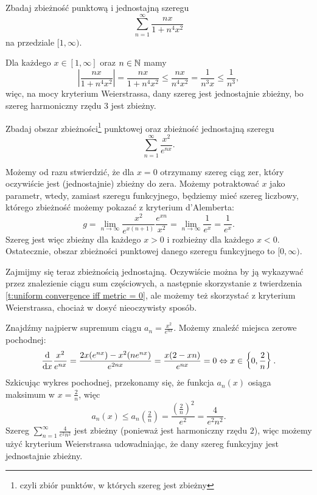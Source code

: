 \begin{example}
    Zbadaj zbieżność punktową i jednostajną szeregu
    \[ \sum_{n=1}^\infty \frac{nx}{1+n^4x^2} \]
    na przedziale $[1,\infty)$.
\end{example}
\begin{solution}
    Dla każdego $x \in [1, \infty]$ oraz $n \in \mathbb N$ mamy
    \[ \left|\frac{nx}{1+n^4x^2}\right| = \frac{nx}{1+n^4x^2} \leq \frac{nx}{n^4x^2} = \frac{1}{n^3x} \leq \frac{1}{n^3}, \]
    więc, na mocy kryterium Weierstrassa, dany szereg jest jednostajnie zbieżny, bo szereg harmoniczny rzędu $3$ jest zbieżny.
\end{solution}

\begin{example}
    Zbadaj obszar zbieżności\footnote{czyli zbiór punktów, w których szereg jest zbieżny} punktowej oraz zbieżność jednostajną szeregu
    \[ \sum_{n=1}^\infty \frac{x^2}{e^{nx}}. \]
\end{example}
\begin{solution}
    Możemy od razu stwierdzić, że dla $x = 0$ otrzymamy szereg ciąg zer, który oczywiście jest (jednostajnie) zbieżny do zera. Możemy potraktować $x$ jako parametr, wtedy, zamiast szeregu funkcyjnego, będziemy mieć szereg liczbowy, którego zbieżność możemy pokazać z kryterium d'Alemberta:
    \[ g = \lim_{n\to\infty} \frac{x^2}{e^{x(n+1)}}\frac{e^{xn}}{x^2} = \lim_{n\to\infty}\frac{1}{e^x} = \frac{1}{e^x}. \]
    Szereg jest więc zbieżny dla każdego $x > 0$ i rozbieżny dla każdego $x < 0$. Ostatecznie, obszar zbieżności punktowej danego szeregu funkcyjnego to $[0,\infty)$.

    Zajmijmy się teraz zbieżnością jednostajną. Oczywiście można by ją wykazywać przez znalezienie ciągu sum częściowych, a następnie skorzystanie z twierdzenia \ref{t:uniform convergence iff metric = 0}, ale możemy też skorzystać z kryterium Weierstrassa, chociaż w dosyć nieoczywisty sposób.

    Znajdźmy najpierw supremum ciągu $a_n = \frac{x^2}{e^{nx}}$. Możemy znaleźć miejsca zerowe pochodnej:
    \[ \frac{\operatorname{d}\!{}}{\operatorname{d}\!{x}} \frac{x^2}{e^{nx}} = \frac{2x(e^{nx}) - x^2(ne^{nx})}{e^{2nx}} = \frac{x(2 - xn)}{e^{nx}} = 0 \Leftrightarrow x \in \left\{0, \frac{2}{n}\right\}. \]
    Szkicując wykres pochodnej, przekonamy się, że funkcja $a_n(x)$ osiąga maksimum w $x = \frac{2}{n}$, więc
    \[ a_n(x) \leq a_n\left(\tfrac{2}{n}\right) = \frac{\left(\frac{2}{n}\right)^2}{e^2} = \frac{4}{e^2n^2}. \]
    Szereg $\sum_{n=1}^\infty \frac{4}{e^2n^2}$ jest zbieżny (ponieważ jest harmoniczny rzędu $2$), więc możemy użyć kryterium Weierstrassa udowadniając, że dany szereg funkcyjny jest jednostajnie zbieżny.
\end{solution}

